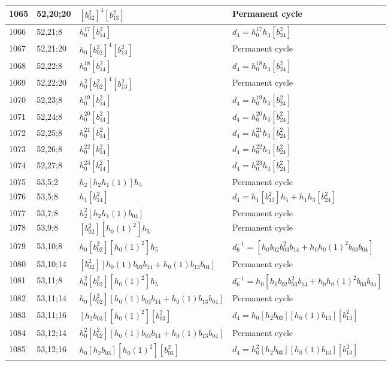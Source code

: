 \documentclass{article}
\begin{document}
\begin{longtable}{|l|l|>{\raggedright\arraybackslash}p{6cm}|>{\raggedright\arraybackslash}p{6cm}|}
\hline
1065 & 52,20;20 & $[b_{02}^2]^4[b_{13}^2]$ & Permanent cycle\\
\hline
1066 & 52,21;8 & $h_0^{17}[b_{14}^2]$ &$d_{4}=h_0^{17}h_3[b_{24}^2]$\\
\hline
1067 & 52,21;20 & $h_0[b_{02}^2]^4[b_{13}^2]$ & Permanent cycle\\
\hline
1068 & 52,22;8 & $h_0^{18}[b_{14}^2]$ &$d_{4}=h_0^{18}h_3[b_{24}^2]$\\
\hline
1069 & 52,22;20 & $h_0^2[b_{02}^2]^4[b_{13}^2]$ & Permanent cycle\\
\hline
1070 & 52,23;8 & $h_0^{19}[b_{14}^2]$ &$d_{4}=h_0^{19}h_3[b_{24}^2]$\\
\hline
1071 & 52,24;8 & $h_0^{20}[b_{14}^2]$ &$d_{4}=h_0^{20}h_3[b_{24}^2]$\\
\hline
1072 & 52,25;8 & $h_0^{21}[b_{14}^2]$ &$d_{4}=h_0^{21}h_3[b_{24}^2]$\\
\hline
1073 & 52,26;8 & $h_0^{22}[b_{14}^2]$ &$d_{4}=h_0^{22}h_3[b_{24}^2]$\\
\hline
1074 & 52,27;8 & $h_0^{23}[b_{14}^2]$ &$d_{4}=h_0^{23}h_3[b_{24}^2]$\\
\hline
1075 & 53,5;2 & $h_2[h_2h_1(1)]h_5$ & Permanent cycle\\
\hline
1076 & 53,5;8 & $h_1[b_{14}^2]$ &$d_{4}=h_1[b_{13}^2]h_5 + h_1h_3[b_{24}^2]$\\
\hline
1077 & 53,7;8 & $h_2^2[h_2h_1(1)b_{04}]$ & Permanent cycle\\
\hline
1078 & 53,9;8 & $[b_{02}^2][h_0(1)^2]h_5$ & Permanent cycle\\
\hline
1079 & 53,10;8 & $h_0[b_{02}^2][h_0(1)^2]h_5$ & $d_{6}^{-1}=[h_0b_{02}b_{03}^2b_{14} + h_0h_0(1)^2b_{03}b_{04}]$\\
\hline
1080 & 53,10;14 & $[b_{02}^2][h_0(1)b_{03}b_{14} + h_0(1)b_{13}b_{04}]$ & Permanent cycle\\
\hline
1081 & 53,11;8 & $h_0^2[b_{02}^2][h_0(1)^2]h_5$ & $d_{6}^{-1}=h_0[h_0b_{02}b_{03}^2b_{14} + h_0h_0(1)^2b_{03}b_{04}]$\\
\hline
1082 & 53,11;14 & $h_0[b_{02}^2][h_0(1)b_{03}b_{14} + h_0(1)b_{13}b_{04}]$ & Permanent cycle\\
\hline
1083 & 53,11;16 & $[h_2b_{03}][h_0(1)^2][b_{03}^2]$ &$d_{4}=h_0[h_2b_{03}][h_0(1)b_{13}][b_{13}^2]$\\
\hline
1084 & 53,12;14 & $h_0^2[b_{02}^2][h_0(1)b_{03}b_{14} + h_0(1)b_{13}b_{04}]$ & Permanent cycle\\
\hline
1085 & 53,12;16 & $h_0[h_2b_{03}][h_0(1)^2][b_{03}^2]$ &$d_{4}=h_0^2[h_2b_{03}][h_0(1)b_{13}][b_{13}^2]$\\

\end{longtable}
\end{document}
